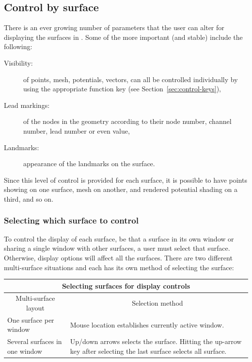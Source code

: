 
\subsection{Control by surface}

There is an ever growing number of parameters that the user can alter
for displaying the surfaces in \map{}.  Some of the more important (and
stable) include the following:

\begin{description}
  \item [Visibility:] of points, mesh, potentials, vectors, \etc{} can all
        be controlled individually by using the appropriate function key
        (see Section~\ref{sec:control-keys}), 
      \item [Lead markings: ] of the nodes in the geometry according to
        their node number, channel number, lead number or even value,
  \item [Landmarks: ] appearance of the landmarks on the surface.
\end{description}

Since this level of control is provided for each surface, it is possible to
have points showing on one surface, mesh on another, and rendered potential
shading on a third, and so on. 

\subsubsection{Selecting which surface to control} 
\label{sec:locks} 

To control the display of each surface, be that a surface in its own window
or sharing a single window with other surfaces, a user must select that
surface.  Otherwise, display options will affect all the surfaces.  There
are two different multi-surface situations and each has its own method of
selecting the surface:
%
\begin{center}
  \begin{tabular}{|l|p{3in}|}\hline
    \multicolumn{2}{|c|}{Selecting surfaces for display controls} \\ \hline
    \multicolumn{1}{|c|}{Multi-surface layout} & 
    \multicolumn{1}{c|}{Selection method} \\ \hline
    One surface per window & Mouse location establishes currently active
    window. \\
    Several surfaces in one window & Up/down arrows selects the surface.
    Hitting 
    the up-arrow key after selecting the last surface selects all surface. \\
    \hline 
  \end{tabular}
\end{center}

